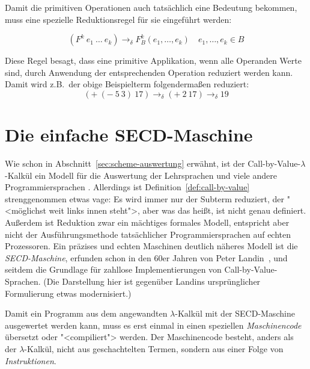 Damit die primitiven Operationen auch tatsächlich eine Bedeutung
bekommen, muss eine spezielle Reduktionsregel für sie eingeführt
werden:
%
\begin{definition}
\begin{displaymath}
  (F^k~e_1~\ldots~e_k) \rightarrow_{\delta} F_B^k(e_1, \ldots, e_k)
  \quad e_1, \ldots, e_k \in B
\end{displaymath}
\end{definition}
%
Diese Regel besagt, dass eine primitive Applikation, wenn alle
Operanden Werte sind, durch Anwendung der entsprechenden Operation 
reduziert werden kann.  Damit wird z.B.\ der
obige Beispielterm folgendermaßen reduziert:
%
\begin{displaymath}
  (+~(-~5~3)~17) \rightarrow_{\delta} (+~2~17) \rightarrow_{\delta} 19
\end{displaymath}

\section{Die einfache SECD-Maschine}

Wie schon in Abschnitt~\ref{sec:scheme-auswertung} erwähnt, ist 
der Call-by-Value-$\lambda$-Kalkül
ein Modell für die Auswertung der Lehrsprachen und viele andere
Programmiersprachen .
Allerdings ist Definition~\ref{def:call-by-value} strenggenommen etwas
vage: Es wird immer nur der Subterm reduziert, der
"<möglichst weit links innen steht">, aber was das heißt, ist nicht
genau definiert.  Außerdem ist Reduktion zwar ein
mächtiges formales Modell, entspricht aber nicht der
Ausführungsmethode tatsächlicher Programmiersprachen auf echten
Prozessoren.  Ein präzises und echten Maschinen deutlich näheres
Modell ist die \textit{SECD-Maschine}, erfunden
schon in den 60er Jahren von Peter Landin~\cite{Landin1964}, und
seitdem die Grundlage für zahllose Implementierungen von
Call-by-Value-Sprachen.  (Die Darstellung hier ist gegenüber Landins
ursprünglicher Formulierung etwas modernisiert.)

Damit ein Programm aus dem angewandten $\lambda$-Kalkül mit der
SECD-Maschine ausgewertet werden kann, muss es erst einmal in einen
speziellen \textit{Maschinencode} übersetzt oder
"<compiliert"> werden.  Der Maschinencode besteht, anders als der
$\lambda$-Kalkül, nicht aus geschachtelten Termen, sondern aus einer
Folge von \textit{Instruktionen}.  


